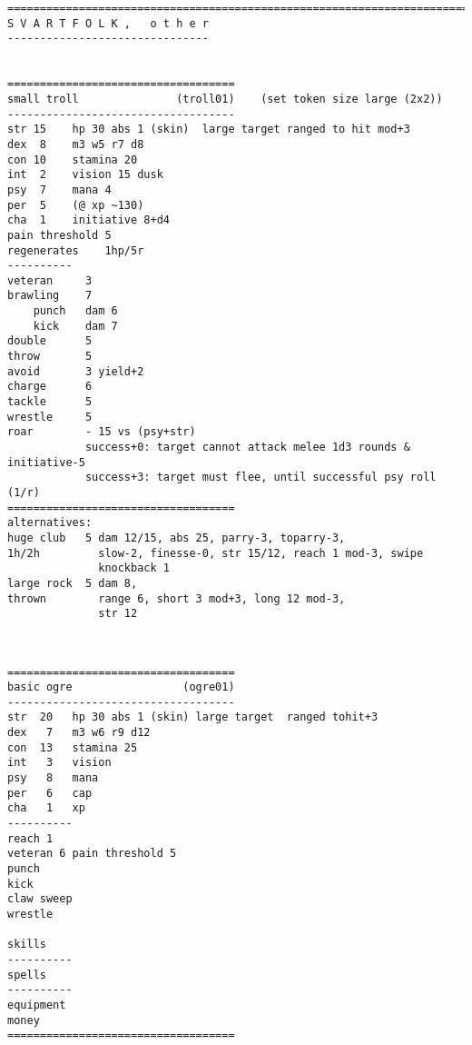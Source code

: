 \pagebreak[2]
\tiny \begin{samepage} \begin{verbatim}
================================================================================
S V A R T F O L K ,   o t h e r
-------------------------------


===================================
small troll               (troll01)    (set token size large (2x2))
-----------------------------------
str 15    hp 30 abs 1 (skin)  large target ranged to hit mod+3
dex  8    m3 w5 r7 d8
con 10    stamina 20
int  2    vision 15 dusk
psy  7    mana 4
per  5    (@ xp ~130)
cha  1    initiative 8+d4
pain threshold 5
regenerates    1hp/5r
----------
veteran     3
brawling    7
    punch   dam 6
    kick    dam 7
double      5
throw       5
avoid       3 yield+2
charge      6
tackle      5
wrestle     5
roar        - 15 vs (psy+str)
            success+0: target cannot attack melee 1d3 rounds & initiative-5
            success+3: target must flee, until successful psy roll (1/r)
===================================
alternatives:
huge club   5 dam 12/15, abs 25, parry-3, toparry-3,
1h/2h         slow-2, finesse-0, str 15/12, reach 1 mod-3, swipe
              knockback 1
large rock  5 dam 8,
thrown        range 6, short 3 mod+3, long 12 mod-3,
              str 12
\end{verbatim} \end{samepage} \normalsize

\

\pagebreak[1]
\tiny \begin{samepage} \begin{verbatim}
===================================
basic ogre                 (ogre01)
-----------------------------------
str  20   hp 30 abs 1 (skin) large target  ranged tohit+3
dex   7   m3 w6 r9 d12
con  13   stamina 25
int   3   vision
psy   8   mana
per   6   cap
cha   1   xp
----------
reach 1
veteran 6 pain threshold 5
punch
kick
claw sweep
wrestle

skills
----------
spells
----------
equipment
money
===================================
\end{verbatim} \end{samepage} \normalsize







